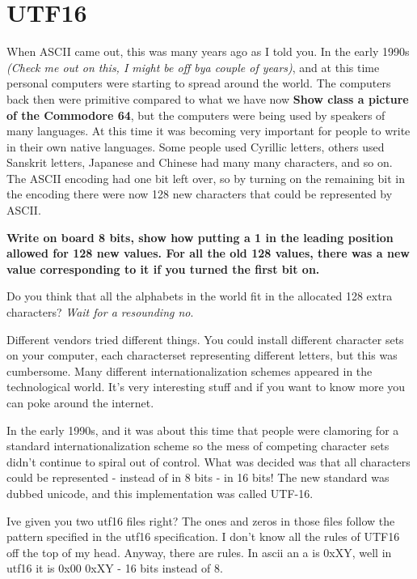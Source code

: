 \documentclass[12pt]{article}
\begin{document}
\section{UTF16}
When ASCII came out, this was many years ago as I told you. In the early 1990s \textit{(Check me out on this, I might be off bya couple of years)}, and at this time personal computers were starting to spread around the world. The computers back then were primitive compared to what we have now \textbf{Show class a picture of the Commodore 64}, but the computers were being used by speakers of many languages. At this time it was becoming very important for people to write in their own native languages. Some people used Cyrillic letters, others used Sanskrit letters, Japanese and Chinese had many many characters, and so on. The ASCII encoding had one bit left over, so by turning on the remaining bit in the encoding there were now 128 new characters that could be represented by ASCII.

\begin{center}
\textbf{Write on board 8 bits, show how putting a 1 in the leading position allowed for 128 new values. For all the old 128 values, there was a new value corresponding to it if you turned the first bit on.}
\end{center}

Do you think that all the alphabets in the world fit in the allocated 128 extra characters? \textit{Wait for a resounding no}.

Different vendors tried different things. You could install different character sets on your computer, each characterset representing different letters, but this was cumbersome. Many different internationalization schemes appeared in the technological world. It's very interesting stuff and if you want to know more you can poke around the internet.

In the early 1990s, and it was about this time that people were clamoring for a standard internationalization scheme so the mess of competing character sets didn't continue to spiral out of control. What was decided was that all characters could be represented - instead of in 8 bits - in 16 bits! The new standard was dubbed unicode, and this implementation was called UTF-16. 

Ive given you two utf16 files right? The ones and zeros in those files follow
the pattern specified in the utf16 specification. I don't know all the rules of
UTF16 off the top of my head. Anyway, there are rules. In ascii an a is 0xXY,
well in utf16 it is 0x00 0xXY - 16 bits instead of 8.
\end{document}

